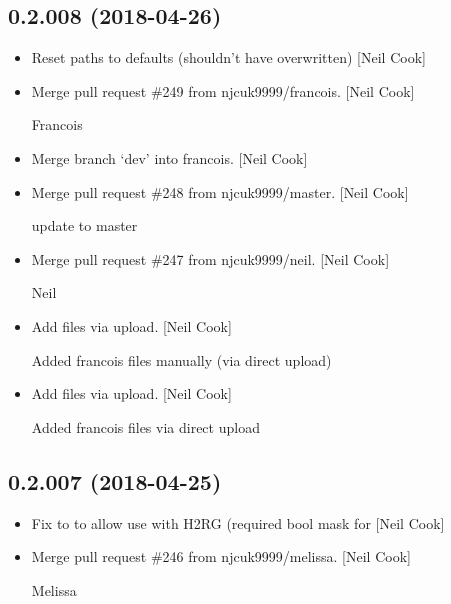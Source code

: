 \documentclass[a4paper,10pt,english]{report}
\begin{document}
\subsection{0.2.008 (2018-04-26)}
\label{\detokenize{misc/changelog:id452}}\begin{itemize}
\item {} 
Reset paths to defaults (shouldn’t have overwritten) {[}Neil Cook{]}

\item {} 
Merge pull request \#249 from njcuk9999/francois. {[}Neil Cook{]}

Francois

\item {} 
Merge branch ‘dev’ into francois. {[}Neil Cook{]}

\item {} 
Merge pull request \#248 from njcuk9999/master. {[}Neil Cook{]}

update to master

\item {} 
Merge pull request \#247 from njcuk9999/neil. {[}Neil Cook{]}

Neil

\item {} 
Add files via upload. {[}Neil Cook{]}

Added francois files manually (via direct upload)

\item {} 
Add files via upload. {[}Neil Cook{]}

Added francois files via direct upload

\end{itemize}


\subsection{0.2.007 (2018-04-25)}
\label{\detokenize{misc/changelog:id453}}\begin{itemize}
\item {} 
Fix to  to allow use with H2RG (required bool mask for
 {[}Neil Cook{]}

\item {} 
Merge pull request \#246 from njcuk9999/melissa. {[}Neil Cook{]}

Melissa

\end{itemize}
\end{document}
